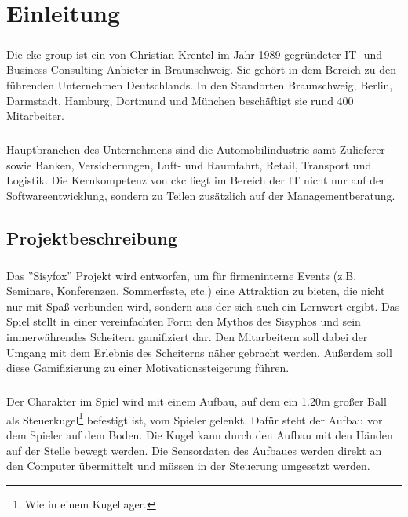 \chapter{Einleitung}
\paragraph{}
Die ckc group ist ein von Christian Krentel im Jahr 1989 gegründeter IT- und Business-Consulting-Anbieter in Braunschweig. Sie gehört in dem Bereich zu den führenden Unternehmen Deutschlands. In den Standorten Braunschweig, Berlin, Darmstadt, Hamburg, Dortmund und München beschäftigt sie rund 400 Mitarbeiter.
\paragraph{}
Hauptbranchen des Unternehmens sind die Automobilindustrie samt Zulieferer sowie Banken, Versicherungen, Luft- und Raumfahrt, Retail, Transport und Logistik. Die Kernkompetenz von ckc liegt im Bereich der IT nicht nur auf der 
Softwareentwicklung, sondern zu Teilen zusätzlich auf der Managementberatung.

\section{Projektbeschreibung}
\paragraph{}
Das ”Sisyfox” Projekt wird entworfen, um für firmeninterne Events (z.B. Seminare, Konferenzen, Sommerfeste, etc.) eine Attraktion zu bieten, die nicht nur mit Spaß verbunden wird, sondern aus der sich auch ein Lernwert ergibt. 
Das Spiel stellt in einer vereinfachten Form den Mythos des Sisyphos und sein immerwährendes Scheitern gamifiziert dar. Den Mitarbeitern soll dabei der Umgang mit dem Erlebnis des Scheiterns näher gebracht werden. Außerdem soll diese Gamifizierung zu einer Motivationssteigerung führen.
\paragraph{}
Der Charakter im Spiel wird mit einem Aufbau, auf dem ein 1.20m großer Ball als Steuerkugel\footnote{Wie in einem Kugellager.} befestigt ist, vom Spieler gelenkt. Dafür steht der Aufbau vor dem Spieler auf dem Boden. 
Die Kugel kann durch den Aufbau mit den Händen auf der Stelle bewegt werden. Die Sensordaten des Aufbaues werden direkt an den Computer übermittelt und müssen in der Steuerung umgesetzt werden. 
